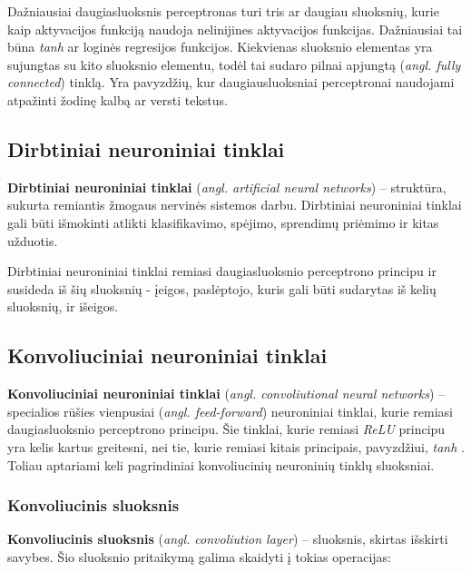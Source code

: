 \documentclass{VUMIFPSbakalaurinis}
\begin{document}
Dažniausiai daugiasluoksnis perceptronas turi tris ar daugiau sluoksnių, kurie kaip aktyvacijos funkciją naudoja nelinijines aktyvacijos funkcijas. Dažniausiai tai būna \textit{tanh} ar loginės regresijos funkcijos. Kiekvienas sluoksnio elementas yra sujungtas su kito sluoksnio elementu, todėl tai sudaro pilnai apjungtą (\textit{angl. fully connected}) tinklą. Yra pavyzdžių, kur daugiausluoksniai perceptronai naudojami atpažinti žodinę kalbą ar versti tekstus.

\subsection{Dirbtiniai neuroniniai tinklai}
\textbf{Dirbtiniai neuroniniai tinklai} (\textit{angl. artificial neural networks}) – struktūra, sukurta remiantis žmogaus nervinės sistemos darbu. Dirbtiniai neuroniniai tinklai gali būti išmokinti atlikti klasifikavimo, spėjimo, sprendimų priėmimo ir kitas užduotis.


Dirbtiniai neuroniniai tinklai remiasi daugiasluoksnio perceptrono principu ir susideda iš šių sluoksnių - įeigos, paslėptojo, kuris gali būti sudarytas iš kelių sluoksnių, ir išeigos.






\subsection{Konvoliuciniai neuroniniai tinklai}

\textbf{Konvoliuciniai neuroniniai tinklai} (\textit{angl. convoliutional neural networks}) – specialios rūšies vienpusiai (\textit{angl. feed-forward}) neuroniniai tinklai, kurie remiasi daugiasluoksnio perceptrono principu. Šie tinklai, kurie remiasi \textit{ReLU} principu yra kelis kartus greitesni, nei tie, kurie remiasi kitais principais, pavyzdžiui, \textit{tanh} \cite{NIPS2012_4824}. Toliau aptariami keli pagrindiniai konvoliucinių neuroninių tinklų sluoksniai.

\subsubsection{Konvoliucinis sluoksnis}

\textbf{Konvoliucinis sluoksnis} (\textit{angl. convoliution layer}) – sluoksnis, skirtas išskirti savybes. Šio sluoksnio 
pritaikymą galima skaidyti į tokias operacijas:
\end{document}
